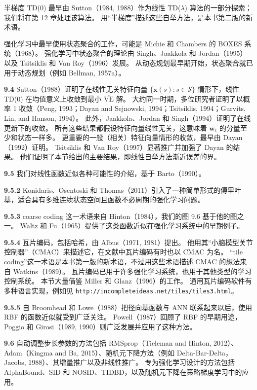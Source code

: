 \documentclass[UTF8, 12pt, fontset=fandol, oneside]{ctexart}
\begin{document}
半梯度 TD(0) 最早由 Sutton（1984, 1988）作为线性 TD($\lambda$) 算法的一部分探索；我们将在第 12 章处理该算法。
用“半梯度”描述这些自举方法，是本书第二版的新术语。

强化学习中最早使用状态聚合的工作，可能是 Michie 和 Chambers 的 BOXES 系统（1968）。
强化学习中状态聚合的理论由 Singh、Jaakkola 和 Jordan（1995）以及 Tsitsiklis 和 Van Roy（1996）发展。
从动态规划最早期开始，状态聚合就已用于动态规划（例如 Bellman, 1957a）。

\noindent\textbf{9.4}
Sutton（1988）证明了在线性无关特征向量 $\{\mathbf{x}(s):s\in\mathcal{S}\}$ 情形下，线性 TD(0) 在均值意义上收敛到最小 $\overline{\mathrm{VE}}$ 解。
大约同一时期，多位研究者证明了以概率 1 收敛（Peng, 1993；Dayan and Sejnowski, 1994；Tsitsiklis, 1994；Gurvits, Lin, and Hanson, 1994）。
此外，Jaakkola、Jordan 和 Singh（1994）证明了在线更新下的收敛。
所有这些结果都假设特征向量线性无关，这意味着 $\mathbf{w}_t$ 的分量至少和状态一样多。
更重要的一般（相关）特征向量情形的收敛，最早由 Dayan（1992）证明。
Tsitsiklis 和 Van Roy（1997）显著推广并加强了 Dayan 的结果。
他们证明了本节给出的主要结果，即线性自举方法渐近误差的界。

\noindent\textbf{9.5}
我们对线性函数近似各种可能性的介绍，基于 Barto（1990）。

\noindent\textbf{9.5.2}
Konidaris、Osentoski 和 Thomas（2011）引入了一种简单形式的傅里叶基，适合具有多维连续状态空间且函数不必周期的强化学习问题。

\noindent\textbf{9.5.3}
coarse coding 这一术语来自 Hinton（1984），我们的图 9.6 基于他的图之一。
Waltz 和 Fu（1965）提供了这类函数近似在强化学习系统中的早期例子。

\noindent\textbf{9.5.4}
瓦片编码，包括哈希，由 Albus（1971, 1981）提出。
他用其“小脑模型关节控制器”（CMAC）来描述它，在文献中瓦片编码有时也以 CMAC 为名。
“tile coding”这一术语是本书第一版的新术语，不过用这些术语描述 CMAC 的想法来自 Watkins（1989）。
瓦片编码已用于许多强化学习系统，也用于其他类型的学习控制系统。
本节大量借鉴 Miller 和 Glanz（1996）的工作。
通用瓦片编码软件有多种语言实现，例如见 \texttt{http://incompleteideas.net/tiles/tiles3.html}。

\noindent\textbf{9.5.5}
自 Broomhead 和 Lowe（1988）把径向基函数与 ANN 联系起来以后，使用 RBF 的函数近似就受到广泛关注。
Powell（1987）回顾了 RBF 的早期用途，Poggio 和 Girosi（1989, 1990）则广泛发展并应用了这种方法。

\noindent\textbf{9.6}
自动调整步长参数的方法包括 RMSprop（Tieleman and Hinton, 2012）、Adam（Kingma and Ba, 2015）、随机元下降方法（例如 Delta-Bar-Delta，Jacobs, 1988）、其增量推广以及非线性推广。
专为强化学习设计的方法包括 AlphaBound、SID 和 NOSID、TIDBD，以及随机元下降在策略梯度学习中的应用。
\end{document}
